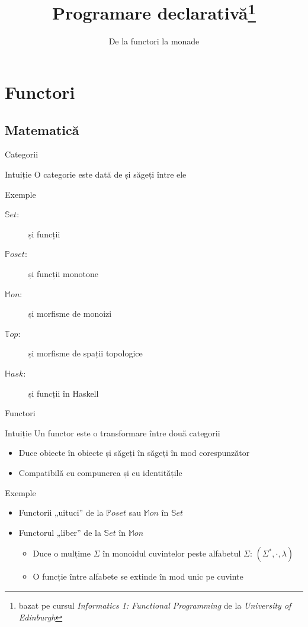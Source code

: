 \documentclass[xcolor=pdftex,romanian,colorlinks]{beamer}
\title[PD---Monade]{Programare declarativă\thanks{bazat pe cursul \emph{Informatics 1: Functional Programming} de la \emph{University of Edinburgh}}}
\subtitle{De la functori la monade}
\begin{document}
\begin{frame}
  \titlepage
\end{frame}

\section{Functori}

\subsection{Matematică}

\begin{frame}{Categorii}

\begin{block}{Intuiție}
O categorie este dată de  și \alert{săgeți} între ele
\end{block}
\begin{block}{Exemple}
\begin{description}
\item[$\mathbb Set$:]  și \alert{funcții}
\item[$\mathbb Poset$:]  și \alert{funcții monotone}
\item[$\mathbb Mon$:]  și \alert{morfisme de monoizi}
\item[$\mathbb Top$:]  și \alert{morfisme de spații topologice}
\item[$\mathbb Hask$:]  și \alert{funcții} în Haskell
\end{description}
\end{block}
\end{frame}

\begin{frame}{Functori}
\begin{block}{Intuiție}
Un functor este o transformare între două categorii
\begin{itemize}
\item Duce obiecte în obiecte și săgeți în săgeți în mod corespunzător
\item Compatibilă cu compunerea și cu identitățile
\end{itemize}
\end{block}

\begin{block}{Exemple}
\begin{itemize}
\item Functorii „uituci” de la $\mathbb{P}oset$ sau $\mathbb{M}on$ în $\mathbb{S}et$
\item Functorul „liber” de la $\mathbb{S}et$ în $\mathbb{M}on$
\begin{itemize}
\item Duce o mulțime $\Sigma$ în monoidul cuvintelor peste alfabetul $\Sigma$: $(\Sigma^\ast, \cdot, \lambda)$
\item O funcție între alfabete se extinde în mod unic pe cuvinte
\end{itemize}
\end{itemize}
\end{block}
\end{frame}
\end{document}
